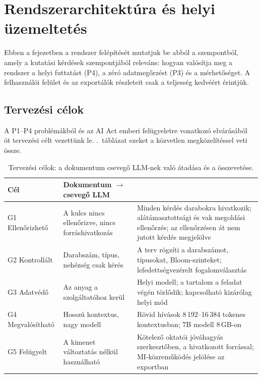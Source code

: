 \chapter{Rendszerarchitektúra és helyi üzemeltetés}
\label{ch:architektura}

Ebben a fejezetben a \Mimir{} rendszer felépítését mutatjuk be abból a szempontból, amely a
kutatási kérdések szempontjából releváns: hogyan valósítja meg a rendszer a helyi futtatást (P4), a
zéró adatmegőrzést (P3) és a mérhetőséget. A felhasználói felület és az exportálók részleteit csak a
teljesség kedvéért érintjük.

\section{Tervezési célok}

A P1--P4 problémákból és az AI Act emberi felügyeletre vonatkozó elvárásából~\cite{aiact2024} öt
tervezési célt vezettünk le. \Az{\ref{tab:celok}}.~táblázat ezeket a közvetlen megközelítéssel veti össze.

\begin{table}[htbp]
\centering
\caption{Tervezési célok: a dokumentum csevegő LLM-nek való átadása és a \Mimir{} összevetése.}
\label{tab:celok}
\small
\begin{tabularx}{\textwidth}{@{}>{\raggedright\arraybackslash}p{2.6cm}>{\raggedright\arraybackslash}X>{\raggedright\arraybackslash}X@{}}
\toprule
Cél & Dokumentum $\to$ csevegő LLM & \Mimir{} \\
\midrule
G1 Ellenőrizhető & A kulcs nincs ellenőrizve, nincs forráshivatkozás & Minden kérdés darabokra hivatkozik; alátámasztottsági és vak megoldási ellenőrzés; az ellenőrzésen át nem jutott kérdés megjelölve \\
G2 Kontrollált & Darabszám, típus, nehézség csak kérés & A terv rögzíti a darabszámot, típusokat, Bloom-szinteket; lefedettségvezérelt fogalomválasztás \\
G3 Adatvédő & Az anyag a szolgáltatóhoz kerül & Helyi modell; a tartalom a feladat végén törlődik; kapcsolható kizárólag helyi mód \\
G4 Megvalósítható & Hosszú kontextus, nagy modell & Rövid hívások 8\,192--16\,384 tokenes kontextusban; 7B modell 8\,GB-on \\
G5 Felügyelt & A kimenet változtatás nélkül használható & Kötelező oktatói jóváhagyás szerkesztőben, a hivatkozott forrással; MI-közreműködés jelölése az exportban \\
\bottomrule
\end{tabularx}
\end{table}

